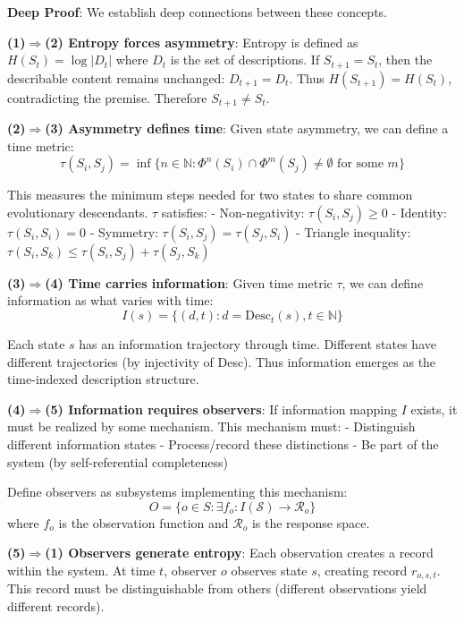 \textbf{Deep Proof}: We establish deep connections between these concepts.

\textbf{(1)$\Rightarrow$(2) Entropy forces asymmetry}:
Entropy is defined as $H(S_t) = \log |D_t|$ where $D_t$ is the set of descriptions.
If $S_{t+1} = S_t$, then the describable content remains unchanged: $D_{t+1} = D_t$.
Thus $H(S_{t+1}) = H(S_t)$, contradicting the premise.
Therefore $S_{t+1} \neq S_t$.

\textbf{(2)$\Rightarrow$(3) Asymmetry defines time}:
Given state asymmetry, we can define a time metric:
\begin{equation}
\tau(S_i, S_j) = \inf\{n \in \mathbb{N}: \Phi^n(S_i) \cap \Phi^m(S_j) \neq \emptyset \text{ for some } m\}
\end{equation}

This measures the minimum steps needed for two states to share common evolutionary descendants.
$\tau$ satisfies:
- Non-negativity: $\tau(S_i, S_j) \geq 0$
- Identity: $\tau(S_i, S_i) = 0$  
- Symmetry: $\tau(S_i, S_j) = \tau(S_j, S_i)$
- Triangle inequality: $\tau(S_i, S_k) \leq \tau(S_i, S_j) + \tau(S_j, S_k)$

\textbf{(3)$\Rightarrow$(4) Time carries information}:
Given time metric $\tau$, we can define information as what varies with time:
\begin{equation}
I(s) = \{(d, t): d = \text{Desc}_t(s), t \in \mathbb{N}\}
\end{equation}

Each state $s$ has an information trajectory through time.
Different states have different trajectories (by injectivity of Desc).
Thus information emerges as the time-indexed description structure.

\textbf{(4)$\Rightarrow$(5) Information requires observers}:
If information mapping $I$ exists, it must be realized by some mechanism.
This mechanism must:
- Distinguish different information states
- Process/record these distinctions
- Be part of the system (by self-referential completeness)

Define observers as subsystems implementing this mechanism:
\begin{equation}
O = \{o \in S: \exists f_o: I(\mathcal{S}) \to \mathcal{R}_o\}
\end{equation}
where $f_o$ is the observation function and $\mathcal{R}_o$ is the response space.

\textbf{(5)$\Rightarrow$(1) Observers generate entropy}:
Each observation creates a record within the system.
At time $t$, observer $o$ observes state $s$, creating record $r_{o,s,t}$.
This record must be distinguishable from others (different observations yield different records).

